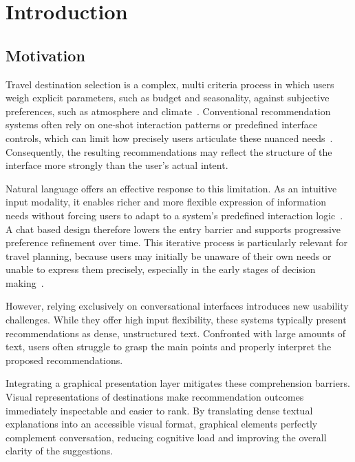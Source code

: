 
\chapter{Introduction}\label{chapter:introduction}

\section{Motivation}\label{section:introduction:motivation}
Travel destination selection is a complex, multi criteria process in which users weigh explicit parameters, such as budget and seasonality, against subjective preferences, such as atmosphere and climate~\parencite{dietzDestinationCharacterization}. Conventional recommendation systems often rely on one-shot interaction patterns or predefined interface controls, which can limit how precisely users articulate these nuanced needs~\parencite{jannachEvaluatingCRS}. Consequently, the resulting recommendations may reflect the structure of the interface more strongly than the user's actual intent.

Natural language offers an effective response to this limitation. As an intuitive input modality, it enables richer and more flexible expression of information needs without forcing users to adapt to a system's predefined interaction logic~\parencite{aliannejadiGenerativeIRInteractions}. A chat based design therefore lowers the entry barrier and supports progressive preference refinement over time. This iterative process is particularly relevant for travel planning, because users may initially be unaware of their own needs or unable to express them precisely, especially in the early stages of decision making~\parencite{aleneziTravelPersonality}.

However, relying exclusively on conversational interfaces introduces new usability challenges. While they offer high input flexibility, these systems typically present recommendations as dense, unstructured text. Confronted with large amounts of text, users often struggle to grasp the main points and properly interpret the proposed recommendations.

Integrating a graphical presentation layer mitigates these comprehension barriers. Visual representations of destinations make recommendation outcomes immediately inspectable and easier to rank. By translating dense textual explanations into an accessible visual format, graphical elements perfectly complement conversation, reducing cognitive load and improving the overall clarity of the suggestions.

